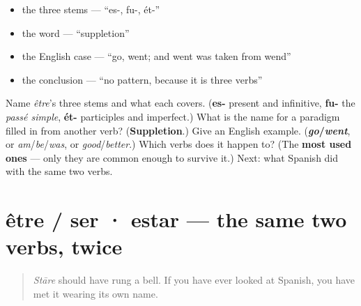\begin{itemize}
\raggedright
  \item the three stems — \textquotedblleft{}es-, fu-, ét-\textquotedblright{}
  \item the word — \textquotedblleft{}suppletion\textquotedblright{}
  \item the English case — \textquotedblleft{}go, went; and went was taken from wend\textquotedblright{}
  \item the conclusion — \textquotedblleft{}no pattern, because it is three verbs\textquotedblright{}
\end{itemize}

\begin{tcolorbox}[breakable,colback=teal!4,colframe=teal!35!black,title={Before you move on}]
Name \emph{être}'s three stems and what each covers. (\textbf{es-} present and infinitive, \textbf{fu-} the \emph{passé simple}, \textbf{ét-} participles and imperfect.) What is the name for a paradigm filled in from another verb? (\textbf{Suppletion}.) Give an English example. (\textbf{\emph{go}/\emph{went}}, or \emph{am}/\emph{be}/\emph{was}, or \emph{good}/\emph{better}.) Which verbs does it happen to? (The \textbf{most used ones} — only they are common enough to survive it.) Next: what Spanish did with the same two verbs.
\end{tcolorbox}
\section[être / ser · estar]{être / ser · estar — the same two verbs, twice}

\label{lesson:FR-C16-ser-estar}



\begin{quote}
\emph{Stāre} should have rung a bell. If you have ever looked at Spanish, you have met it wearing its own name.
\end{quote}

